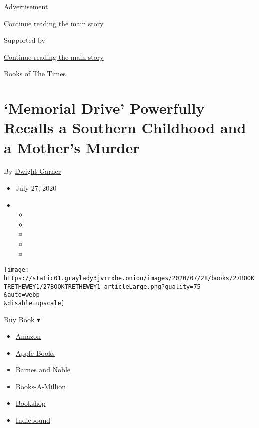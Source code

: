 Advertisement

\protect\hyperlink{after-top}{Continue reading the main story}

Supported by

\protect\hyperlink{after-sponsor}{Continue reading the main story}

\href{/column/books-of-the-times}{Books of The Times}

\hypertarget{memorial-drive-powerfully-recalls-a-southern-childhood-and-a-mothers-murder}{%
\section{`Memorial Drive' Powerfully Recalls a Southern Childhood and a
Mother's
Murder}\label{memorial-drive-powerfully-recalls-a-southern-childhood-and-a-mothers-murder}}

By \href{https://www.nytimes3xbfgragh.onion/by/dwight-garner}{Dwight
Garner}

\begin{itemize}
\item
  July 27, 2020
\item
  \begin{itemize}
  \item
  \item
  \item
  \item
  \item
  \end{itemize}
\end{itemize}

\texttt{[image: https://static01.graylady3jvrrxbe.onion/images/2020/07/28/books/27BOOKTRETHEWEY1/27BOOKTRETHEWEY1-articleLarge.png?quality=75\\\&auto=webp\\\&disable=upscale]}

Buy Book ▾

\begin{itemize}
\tightlist
\item
  \href{https://www.amazon.com/gp/search?index=books\&tag=NYTBSREV-20\&field-keywords=Memorial+Drive+Natasha+Trethewey}{Amazon}
\item
  \href{https://du-gae-books-dot-nyt-du-prd.appspot.com/buy?title=Memorial+Drive\&author=Natasha+Trethewey}{Apple
  Books}
\item
  \href{https://www.anrdoezrs.net/click-7990613-11819508?url=https\%3A\%2F\%2Fwww.barnesandnoble.com\%2Fw\%2F\%3Fean\%3D9780062248572}{Barnes
  and Noble}
\item
  \href{https://www.anrdoezrs.net/click-7990613-35140?url=https\%3A\%2F\%2Fwww.booksamillion.com\%2Fp\%2FMemorial\%2BDrive\%2FNatasha\%2BTrethewey\%2F9780062248572}{Books-A-Million}
\item
  \href{https://bookshop.org/a/3546/9780062248572}{Bookshop}
\item
  \href{https://www.indiebound.org/book/9780062248572?aff=NYT}{Indiebound}
\end{itemize}

